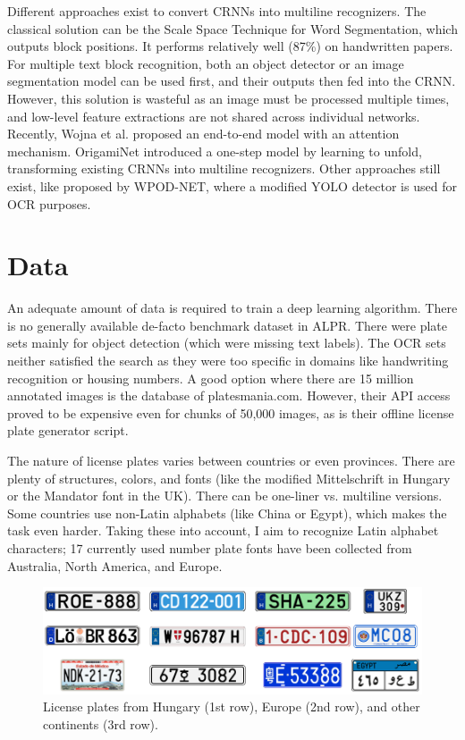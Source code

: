 Different approaches exist to convert CRNNs into multiline recognizers. The classical solution can be the Scale Space Technique for Word Segmentation\cite{ScaleWordSeg}, which outputs block positions. It performs relatively well (87\%) on handwritten papers. For multiple text block recognition, both an object detector or an image segmentation model can be used first, and their outputs then fed into the CRNN. However, this solution is wasteful as an image must be processed multiple times, and low-level feature extractions are not shared across individual networks. Recently, Wojna et al.\cite{Attention-basedExtract} proposed an end-to-end model with an attention mechanism. OrigamiNet\cite{OrigamiNet} introduced a one-step model by learning to unfold, transforming existing CRNNs into multiline recognizers. Other approaches still exist, like proposed by WPOD-NET\cite{WPOD-NET}, where a modified YOLO detector is used for OCR purposes.

\section{Data}

An adequate amount of data is required to train a deep learning algorithm. There is no generally available de-facto benchmark dataset in ALPR. There were plate sets mainly for object detection (which were missing text labels). The OCR sets neither satisfied the search as they were too specific in domains like handwriting recognition or housing numbers. A good option where there are 15 million annotated images is the database of platesmania.com\cite{PlatesMania}. However, their API access proved to be expensive even for chunks of 50,000 images, as is their offline license plate generator script.

The nature of license plates varies between countries or even provinces. There are plenty of structures, colors, and fonts (like the modified Mittelschrift in Hungary or the Mandator font in the UK). There can be one-liner vs. multiline versions. Some countries use non-Latin alphabets (like China or Egypt), which makes the task even harder. Taking these into account, I aim to recognize Latin alphabet characters; 17 currently used number plate fonts have been collected from Australia, North America, and Europe.

\begin{figure}[htb]
 \centerline{\includegraphics[width=.85\columnwidth]{.//Figure/OCR/plates.png}}
 \caption{License plates from Hungary (1st row), Europe (2nd row), and other continents (3rd row).}
 \label{fig:simple}
\end{figure}

